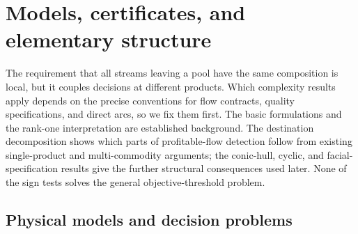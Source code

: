 \section{Models, certificates, and elementary structure}\label{s1:foundations}

The requirement that all streams leaving a pool have the same
composition is local, but it couples decisions at different products.
Which complexity results apply depends on the precise conventions for
flow contracts, quality specifications, and direct arcs, so we fix them
first. The basic formulations and the rank-one interpretation are
established background. The destination decomposition shows which parts
of profitable-flow detection follow from existing single-product and
multi-commodity arguments; the conic-hull, cyclic, and
facial-specification results give the further structural consequences
used later. None of the sign tests solves the general
objective-threshold problem.

\subsection{Physical models and decision problems}\label{s1:model}

